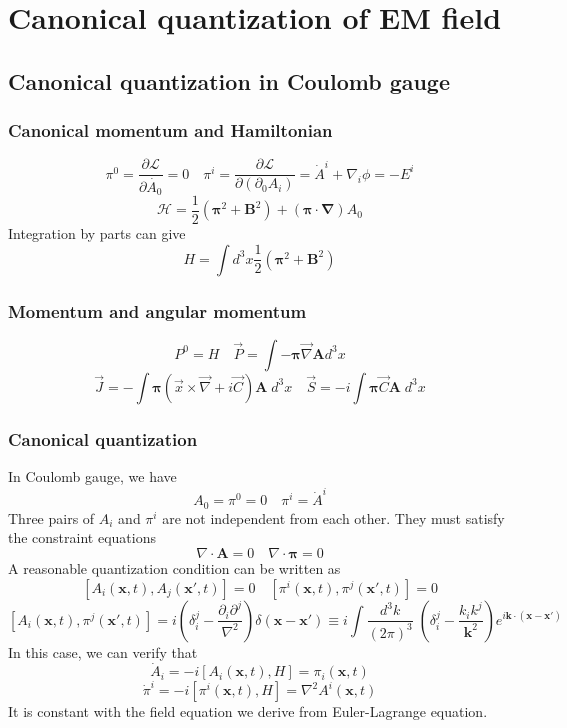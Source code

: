 \documentclass[cyan]{elegantnote}
\begin{document}
\section{Canonical quantization of EM field}
\subsection{Canonical quantization in Coulomb gauge}

\subsubsection{Canonical momentum and Hamiltonian}
\[\pi^0 = \frac{\partial \mathcal{L}}{\partial \dot{A_0}} = 0 \quad  \pi^{i} = \frac{\partial \mathcal{L}}{\partial(\partial_0 A_i)} = \dot{A}^i + \nabla_i \phi = -E^i\]
\[\mathcal{H} = \frac{1}{2}(\bm{\pi}^2 + \bm{B}^2) + (\bm{\pi} \cdot \bm{\nabla}) A_0\]
Integration by parts can give
\[H = \int d^3x \frac{1}{2}(\bm{\pi}^2 + \bm{B}^2)\]

\subsubsection{Momentum and angular momentum}
\[P^0 = H \quad \vec{P} = \int - \bm{\pi} \vec{\nabla} \bm{A} d^3x\]
\[\vec{J} = - \int \bm{\pi} (\vec{x}\times \vec{\nabla} + i \vec{C})\bm{A} \; d^3x \quad \vec{S} = -i \int \bm{\pi} \vec{C} \bm{A} \; d^3x\]

\subsubsection{Canonical quantization}
\noindent
In Coulomb gauge, we have
\[A_0 = \pi^0 = 0 \quad \pi^i = \dot{A}^i \]
Three pairs of $A_i$ and $\pi^i$ are not independent from each other. They must satisfy the constraint equations
\[\nabla \cdot \bm{A} = 0 \quad \nabla \cdot \bm{\pi} = 0\]
A reasonable quantization condition can be written as
\[[A_i(\bm{x},t),A_j(\bm{x}',t)] = 0 \quad [\pi^i(\bm{x},t),\pi^j(\bm{x}',t)] = 0\]
\[[A_i(\bm{x},t),\pi^j(\bm{x}',t)] = i \left( \delta^{j}_i - \frac{\partial_i \partial^j}{\nabla^2} \right) \delta(\bm{x}-\bm{x}') \equiv i \int \frac{d^3k}{(2\pi)^3} \; (\delta^j_i - \frac{k_ik^j}{\bm{k}^2})e^{i\bm{k}\cdot(\bm{x}-\bm{x}')}\]
In this case, we can verify that
\[\dot{A}_i = -i[A_i(\bm{x},t),H] = \pi_i (\bm{x},t)\]
\[\dot{\pi}^i = -i[\pi^i(\bm{x},t),H] = \nabla^2 A^i(\bm{x},t)\]
It is constant with the field equation we derive from Euler-Lagrange equation.
\end{document}
